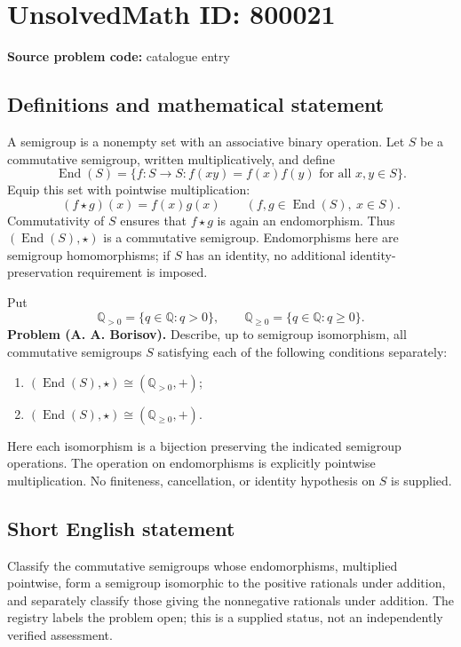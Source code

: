 \documentclass[11pt]{article}
\newcommand{\Q}{\mathbb{Q}}
\begin{document}
\section*{UnsolvedMath ID: 800021}
\textbf{Source problem code:} catalogue entry
\subsection{Definitions and mathematical statement}
A semigroup is a nonempty set with an associative binary operation. Let \(S\) be a commutative semigroup, written multiplicatively, and define
\[
\operatorname{End}(S)=\{f:S\to S: f(xy)=f(x)f(y)\text{ for all }x,y\in S\}.
\]
Equip this set with pointwise multiplication:
\[
(f\star g)(x)=f(x)g(x)\qquad(f,g\in\operatorname{End}(S),\ x\in S).
\]
Commutativity of \(S\) ensures that \(f\star g\) is again an endomorphism. Thus \((\operatorname{End}(S),\star)\) is a commutative semigroup. Endomorphisms here are semigroup homomorphisms; if \(S\) has an identity, no additional identity-preservation requirement is imposed.

Put
\[
\Q_{>0}=\{q\in\Q:q>0\},\qquad
\Q_{\geq0}=\{q\in\Q:q\geq0\}.
\]
\textbf{Problem (A. A. Borisov).} Describe, up to semigroup isomorphism, all commutative semigroups \(S\) satisfying each of the following conditions separately:
\begin{enumerate}
\item \((\operatorname{End}(S),\star)\cong(\Q_{>0},+)\);
\item \((\operatorname{End}(S),\star)\cong(\Q_{\geq0},+)\).
\end{enumerate}
Here each isomorphism is a bijection preserving the indicated semigroup operations. The operation on endomorphisms is explicitly pointwise multiplication. No finiteness, cancellation, or identity hypothesis on \(S\) is supplied.
\subsection{Short English statement}
Classify the commutative semigroups whose endomorphisms, multiplied pointwise, form a semigroup isomorphic to the positive rationals under addition, and separately classify those giving the nonnegative rationals under addition. The registry labels the problem open; this is a supplied status, not an independently verified assessment.
\end{document}

